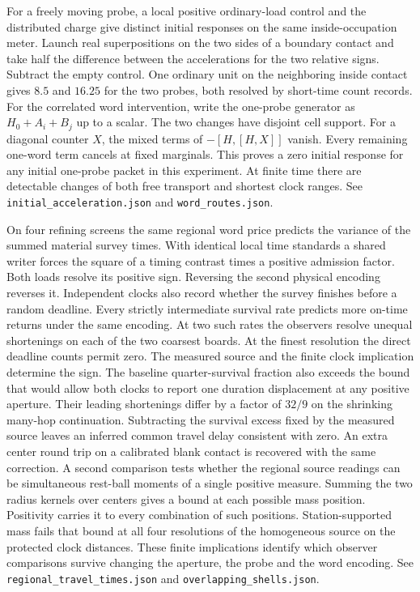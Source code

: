 \documentclass[11pt]{article}
\begin{document}
For a freely moving probe, a local positive ordinary-load control and
the distributed charge give distinct initial responses on the same
inside-occupation meter. Launch real superpositions on the two sides
of a boundary contact and take half the difference between the
accelerations for the two relative signs. Subtract the empty control.
One ordinary unit on the neighboring inside contact gives \(8.5\) and
\(16.25\) for the two probes, both resolved by short-time count
records. For the correlated word intervention, write the one-probe
generator as \(H_0+A_i+B_j\) up to a scalar. The two changes have
disjoint cell support. For a diagonal counter \(X\), the mixed terms
of \(-[H,[H,X]]\) vanish. Every remaining one-word term cancels at
fixed marginals. This proves a zero initial response for any initial
one-probe packet in this experiment. At finite time there are
detectable changes of both free transport and shortest clock ranges.
See \texttt{initial\_acceleration.json} and \texttt{word\_routes.json}.

On four refining screens the same regional word price predicts the
variance of the summed material survey times. With identical local
time standards a shared writer forces the square of a timing contrast
times a positive admission factor. Both loads resolve its positive sign.
Reversing the second physical encoding reverses it. Independent clocks
also record whether the survey finishes before a random deadline. Every
strictly intermediate survival rate predicts more on-time returns under
the same encoding. At two such rates the observers resolve unequal
shortenings on each of the two coarsest boards. At the finest resolution
the direct deadline counts permit zero. The measured source and the
finite clock implication determine the sign. The baseline
quarter-survival fraction also exceeds the bound that would allow both
clocks to report one duration displacement at any positive aperture.
Their leading shortenings differ by a factor of \(32/9\) on the
shrinking many-hop continuation. Subtracting the survival excess fixed
by the measured source leaves an inferred common travel delay consistent
with zero. An extra center round trip on a calibrated blank contact is
recovered with the same correction. A second comparison
tests whether the regional source readings can be simultaneous
rest-ball moments of a single positive measure. Summing the two radius
kernels over centers gives a bound at each possible mass position.
Positivity carries it to every combination of such positions.
Station-supported mass fails that bound at all four resolutions of
the homogeneous source on the protected clock distances. These
finite implications identify which observer comparisons survive
changing the aperture, the probe and the word encoding.
See \texttt{regional\_travel\_times.json} and
\texttt{overlapping\_shells.json}.
\end{document}
